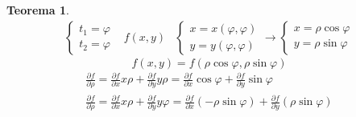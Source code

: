 \documentclass{book}
\newtheorem{teorema}{Teorema}
\begin{document}
\begin{teorema}
\begin{equation*}
\begin{matrix}
\begin{cases}
					t_1=\varphi\\
					t_2=\varphi
				\end{cases} & f(x,y) &
				\begin{cases}
					x=x(\varphi,\varphi)\\
					y=y(\varphi,\varphi)
				\end{cases}\to \begin{cases}
					x=\rho\cos \varphi\\
					y=\rho \sin \varphi
				\end{cases}
			\end{matrix}
		\end{equation*}
		\begin{equation*}
			f(x,y)=f(\rho\cos\varphi,\rho \sin \varphi)
		\end{equation*}
		\begin{equation*}
			\begin{matrix}
				\frac{\partial f}{\partial \rho}=\frac{\partial f}{\partial x}
				x\rho+\frac{\partial f}{\partial y}y\rho=
				\frac{\partial f}{\partial x} \cos \varphi+
				\frac{\partial f}{\partial y} \sin \varphi\\
				\frac{\partial f}{\partial \rho}=\frac{\partial f}{\partial x}
				x\rho+\frac{\partial f}{\partial y}y\varphi=
				\frac{\partial f}{\partial x} (-\rho\sin \varphi)+
				\frac{\partial f}{\partial y} (\rho\sin \varphi)
			\end{matrix}
		\end{equation*}
\end{teorema}
\end{document}
